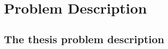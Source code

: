 \chapter{Problem Description}
\label{sec:problem-description}

\section{The thesis problem description}

